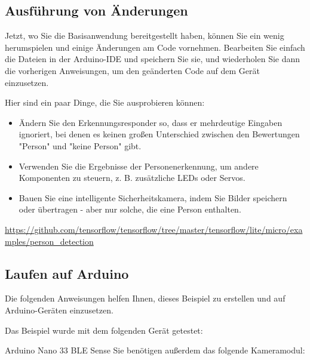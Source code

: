 \subsection{Ausführung von Änderungen}

Jetzt, wo Sie die Basisanwendung bereitgestellt haben, können Sie ein wenig herumspielen und einige Änderungen am Code vornehmen. Bearbeiten Sie einfach die Dateien in der Arduino-IDE und speichern Sie sie, und wiederholen Sie dann die vorherigen Anweisungen, um den geänderten Code auf dem Gerät einzusetzen.

Hier sind ein paar Dinge, die Sie ausprobieren können:

\begin{itemize}
  \item Ändern Sie den Erkennungsresponder so, dass er mehrdeutige Eingaben ignoriert, bei denen es keinen großen Unterschied zwischen den Bewertungen "Person" und "keine Person" gibt.
\item Verwenden Sie die Ergebnisse der Personenerkennung, um andere Komponenten zu steuern, z. B. zusätzliche LEDs oder Servos.
\item Bauen Sie eine intelligente Sicherheitskamera, indem Sie Bilder speichern oder übertragen - aber nur solche, die eine Person enthalten.
\end{itemize}





















\cite{Chowdhery:2019}


\url{https://github.com/tensorflow/tensorflow/tree/master/tensorflow/lite/micro/examples/person\_detection}

\subsection{Laufen auf Arduino}

Die folgenden Anweisungen helfen Ihnen, dieses Beispiel zu erstellen und auf Arduino-Geräten einzusetzen.

Das Beispiel wurde mit dem folgenden Gerät getestet:

Arduino Nano 33 BLE Sense
Sie benötigen außerdem das folgende Kameramodul:

